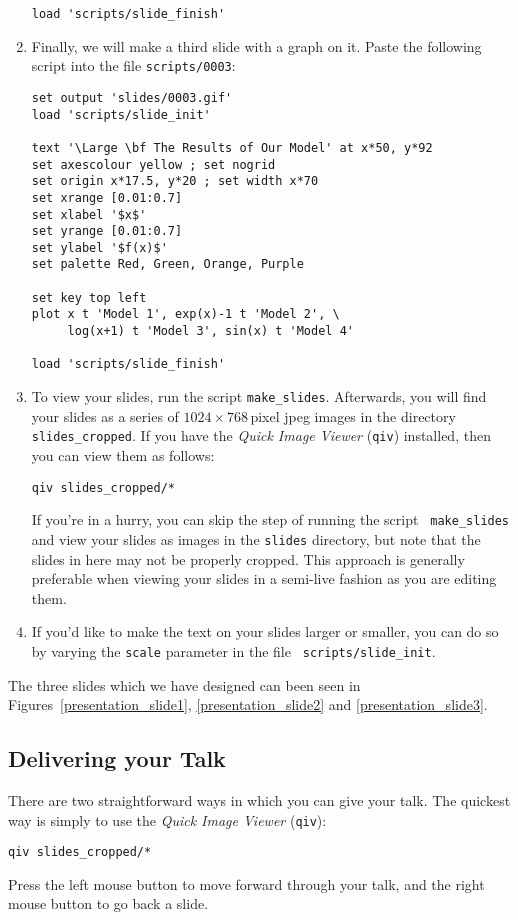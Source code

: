 \begin{enumerate}
\begin{verbatim}
load 'scripts/slide_finish'
\end{verbatim}
\item Finally, we will make a third slide with a graph on it. Paste the
following script into the file {\tt scripts/0003}:
\begin{verbatim}
set output 'slides/0003.gif'
load 'scripts/slide_init'

text '\Large \bf The Results of Our Model' at x*50, y*92
set axescolour yellow ; set nogrid
set origin x*17.5, y*20 ; set width x*70
set xrange [0.01:0.7]
set xlabel '$x$'
set yrange [0.01:0.7]
set ylabel '$f(x)$'
set palette Red, Green, Orange, Purple

set key top left
plot x t 'Model 1', exp(x)-1 t 'Model 2', \
     log(x+1) t 'Model 3', sin(x) t 'Model 4'

load 'scripts/slide_finish'
\end{verbatim}
\item To view your slides, run the script {\tt make\_slides}. Afterwards, you
will find your slides as a series of $1024\times768$\,pixel jpeg images in the
directory {\tt slides\_cropped}.  If you have the {\it Quick Image
Viewer}\index{Quick Image Viewer} ({\tt qiv}) installed, then you can view them
as follows:
\begin{verbatim}
qiv slides_cropped/*
\end{verbatim}
If you're in a hurry, you can skip the step of running the script {\tt
make\_slides} and view your slides as images in the {\tt slides} directory, but
note that the slides in here may not be properly cropped. This approach is
generally preferable when viewing your slides in a semi-live fashion as you are
editing them.
\item If you'd like to make the text on your slides larger or smaller, you can
do so by varying the {\tt scale} parameter in the file {\tt
scripts/slide\_init}.
\end{enumerate}

The three slides which we have designed can been seen in
Figures~\ref{presentation_slide1}, \ref{presentation_slide2} and
\ref{presentation_slide3}.

\subsection{Delivering your Talk}

There are two straightforward ways in which you can give your talk. The
quickest way is simply to use the {\it Quick Image Viewer}\index{Quick Image
Viewer} ({\tt qiv}):
\begin{verbatim}
qiv slides_cropped/*
\end{verbatim}
Press the left mouse button to move forward through your talk, and the right
mouse button to go back a slide.

